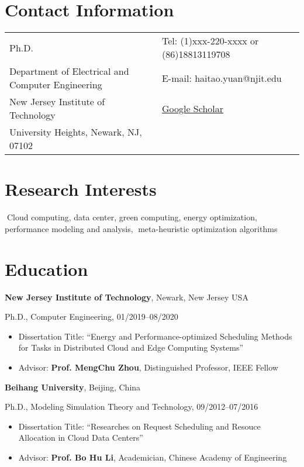 \documentclass[margin,line]{res}
\newenvironment{list1}{
\begin{list}{\ding{113}}{%
\setlength{\itemsep}{0in}
\setlength{\parsep}{0in} \setlength{\parskip}{0in}
\setlength{\topsep}{0in} \setlength{\partopsep}{0in} 
\setlength{\leftmargin}{0.17in}}}{\end{list}}
\begin{document}

\begin{resume}
\section{\sc Contact Information}
\vspace{.05in}
\begin{tabular}{@{}p{3.2in}p{4in}}
Ph.D.             & {Tel:}  (1)xxx-220-xxxx or (86)18813119708\\            
Department of Electrical and Computer Engineering   & {E-mail:}  haitao.yuan@njit.edu \\
New Jersey Institute of Technology & {\href{https://scholar.google.com.hk/citations?user=ifV9ph4AAAAJ\&hl=en}{Google Scholar}}\\
University Heights, Newark, NJ, 07102  & \\
\end{tabular}

\section{\sc Research Interests}
Cloud computing, data center, green computing, energy optimization, performance modeling and analysis, meta-heuristic optimization algorithms

\section{\sc Education}
{\bf New Jersey Institute of Technology}, Newark, New Jersey USA\\
\vspace*{-.1in}
\begin{list1}
\item[] Ph.D., Computer Engineering, \hfill{01/2019--08/2020}
\begin{itemize}
\item Dissertation Title: ``Energy and Performance-optimized Scheduling Methods for Tasks in Distributed Cloud and Edge Computing Systems''
\item Advisor:  \textbf{Prof. MengChu Zhou}, Distinguished Professor, IEEE Fellow
\end{itemize}
\end{list1}

{\bf Beihang University}, Beijing, China\\
\vspace*{-.1in}
\begin{list1}
\item[] Ph.D., Modeling Simulation Theory and Technology, \hfill{09/2012--07/2016}
\begin{itemize}
\item Dissertation Title: ``Researches on Request Scheduling and Resouce Allocation in Cloud Data Centers''
\item Advisor:  \textbf{Prof. Bo Hu Li}, Academician, Chinese Academy of Engineering
\end{itemize}
\end{list1}


\end{resume}
\end{document}
